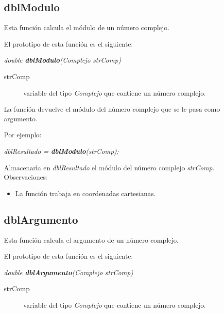 \subsection{dblModulo}
Esta funci\'on calcula el m\'odulo de un n\'umero complejo.\newline

El prototipo de esta funci\'on es el siguiente:

\begin{center}
\emph{double \textbf{dblModulo}(Complejo strComp)}
\end{center}

\begin{description}
\item[strComp] variable del tipo \emph{Complejo} que contiene un n\'umero
complejo.
\end{description}

La funci\'on devuelve el m\'odulo del n\'umero complejo que se le pasa como
argumento.\newline

Por ejemplo:

\begin{center}
\emph{dblResultado = \textbf{dblModulo}(strComp);}
\end{center}

Almacenar\'{\i}a en \emph{dblResultado} el m\'odulo del n\'umero complejo
\emph{strComp}.\\

Observaciones:

\begin{itemize}
\item La funci\'on trabaja en coordenadas cartesianas.
\end{itemize}

\subsection{dblArgumento}
Esta funci\'on calcula el argumento de un n\'umero complejo.\newline

El prototipo de esta funci\'on es el siguiente:

\begin{center}
\emph{double \textbf{dblArgumento}(Complejo strComp)}
\end{center}

\begin{description}
\item[strComp] variable del tipo \emph{Complejo} que contiene un n\'umero
complejo.
\end{description}

